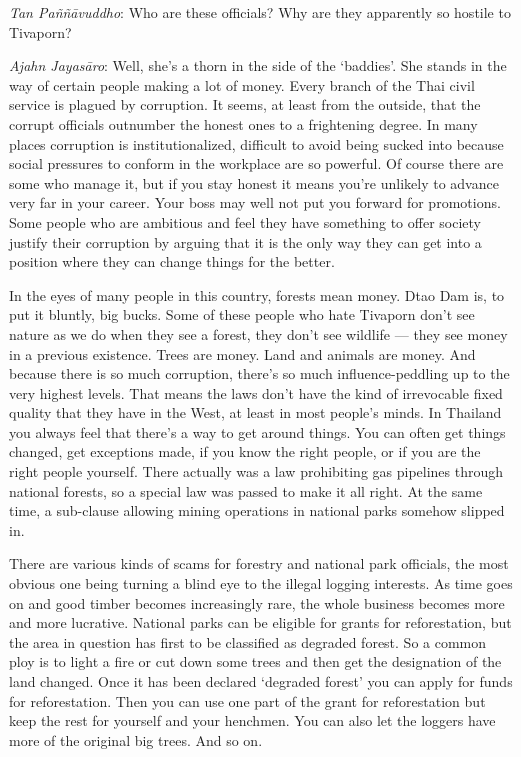 \emph{Tan Paññāvuddho}: Who are these officials? Why are they apparently
so hostile to Tivaporn?

\emph{Ajahn Jayasāro‎}: Well, she's a thorn in the side of the
`baddies'. She stands in the way of certain people making a lot of
money. Every branch of the Thai civil service is plagued by corruption.
It seems, at least from the outside, that the corrupt officials
outnumber the honest ones to a frightening degree. In many places
corruption is institutionalized, difficult to avoid being sucked into
because social pressures to conform in the workplace are so powerful. Of
course there are some who manage it, but if you stay honest it means
you're unlikely to advance very far in your career. Your boss may well
not put you forward for promotions. Some people who are ambitious and
feel they have something to offer society justify their corruption by
arguing that it is the only way they can get into a position where they
can change things for the better.

In the eyes of many people in this country, forests mean money. Dtao Dam
is, to put it bluntly, big bucks. Some of these people who hate Tivaporn
don't see nature as we do when they see a forest, they don't see
wildlife --- they see money in a previous existence. Trees are money.
Land and animals are money. And because there is so much corruption,
there's so much influence-peddling up to the very highest levels. That
means the laws don't have the kind of irrevocable fixed quality that
they have in the West, at least in most people's minds. In Thailand you
always feel that there's a way to get around things. You can often get
things changed, get exceptions made, if you know the right people, or if
you are the right people yourself. There actually was a law prohibiting
gas pipelines through national forests, so a special law was passed to
make it all right. At the same time, a sub-clause allowing mining
operations in national parks somehow slipped in.

There are various kinds of scams for forestry and national park
officials, the most obvious one being turning a blind eye to the illegal
logging interests. As time goes on and good timber becomes increasingly
rare, the whole business becomes more and more lucrative. National parks
can be eligible for grants for reforestation, but the area in question
has first to be classified as degraded forest. So a common ploy is to
light a fire or cut down some trees and then get the designation of the
land changed. Once it has been declared `degraded forest' you can apply
for funds for reforestation. Then you can use one part of the grant for
reforestation but keep the rest for yourself and your henchmen. You can
also let the loggers have more of the original big trees. And so on.

